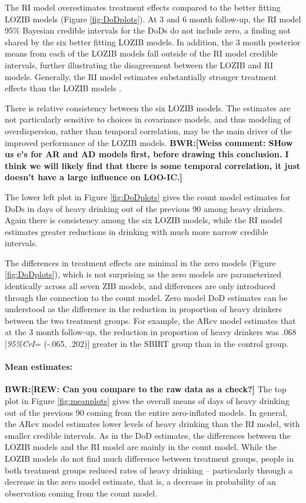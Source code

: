 \documentclass[12pt]{article}
\def\bwr#1{{\color{violet}\textbf{BWR:[#1]}}}
\begin{document}
The RI model overestimates treatment effects compared to the better fitting LOZIB models (Figure \ref{fig:DoDplots}). At 3 and 6 month follow-up, the RI model 95\% Bayesian credible intervals for the DoDs do not include zero, a finding not shared by the six better fitting LOZIB models. In addition, the 3 month posterior means from each of the LOZIB models fall outside of the RI model credible intervals, further illustrating the disagreement between the LOZIB and RI models. Generally, the RI model estimates substantially stronger treatment effects than the LOZIB models .

There is relative consistency between the six LOZIB models. The estimates are not particularly sensitive to choices in covariance models, and thus modeling of overdispersion, rather than temporal correlation, may be the main driver of the improved performance of the LOZIB models. \bwr{Weiss comment: SHow us e's for AR and AD models first, before drawing this conclusion. I think we will likely find that there is some temporal correlation, it just doesn't have a large influence on LOO-IC.}

The lower left plot in Figure \ref{fig:DoDplots} gives the count model estimates for DoDs in days of heavy drinking out of the previous 90 among heavy drinkers. Again there is consistency among the six LOZIB models, while the RI model estimates greater reductions in drinking with much more narrow credible intervals.

The differences in treatment effects are minimal in the zero models (Figure \ref{fig:DoDplots}), which is not surprising as the zero models are parameterized identically across all seven ZIB models, and differences are only introduced through the connection to the count model. Zero model DoD estimates can be understood as the difference in the reduction in proportion of heavy drinkers between the two treatment groups. For example, the ARcv model estimates that at the 3 month follow-up, the reduction in proportion of heavy drinkers was .068 [\textit{95\%CrI}= (-.065, .202)] greater in the SBIRT group than in the control group.

\paragraph{Mean estimates:}
\bwr{REW: Can you compare to the raw data as a check?}
The top plot in Figure \ref{fig:meanplots} gives the overall means of days of heavy drinking out of the previous 90 coming from the entire zero-inflated models. In general, the ARcv model estimates lower levels of heavy drinking than the RI model, with smaller credible intervals. As in the DoD estimates, the differences between the LOZIB models and the RI model are mainly in the count model. While the LOZIB models do not find much difference between treatment groups, people in both treatment groups reduced rates of heavy drinking -- particularly through a decrease in the zero model estimate, that is, a decrease in probability of an observation coming from the count model.
\end{document}
